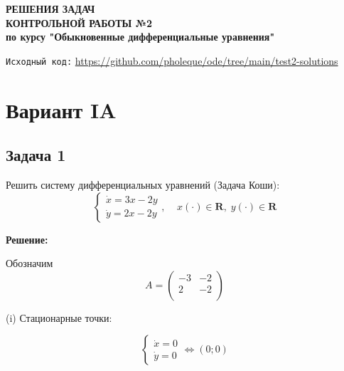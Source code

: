 \documentclass[a4paper, 12pt]{article}
\begin{document}
\begin{titlepage}
\begin{center}


\vfill






\textbf{РЕШЕНИЯ ЗАДАЧ \\[3mm]
КОНТРОЛЬНОЙ РАБОТЫ №2\\[3mm]
по курсу "Обыкновенные дифференциальные уравнения"
\\[20mm]
}
\end{center}

\texttt{Исходный код:} \href{https://github.com/pholeque/ode/tree/main/test2-solutions}{\color{red} {https://github.com/pholeque/ode/tree/main/test2-solutions}}
\tableofcontents

\end{titlepage}

\newpage




	\section{Вариант IA}
		\subsection {Задача 1}


 Решить систему дифференциальных уравнений (Задача Коши): 
\begin{equation}
\left\{
\begin{array}{lr}
\dot{x} = 3x-2y\\
\dot{y} = 2x-2y
\end{array}
\right.
, \;\;\;\; x(\cdot)\in \textbf{R},\; y(\cdot)\in \textbf{R}
\label{eq:1}
\end{equation}

\textbf{Решение:} \par
Обозначим 
\[
A = \left(
\begin{array}{cc}
-3 & -2\\
2 & -2\\
\end{array}
\right)\]

(i) Стационарные точки:

\[
\left\{
\begin{array}{lr}
\dot{x} = 0\\
\dot{y} = 0
\end{array}
\right.
\Leftrightarrow (0;0)
\]
\end{document}
